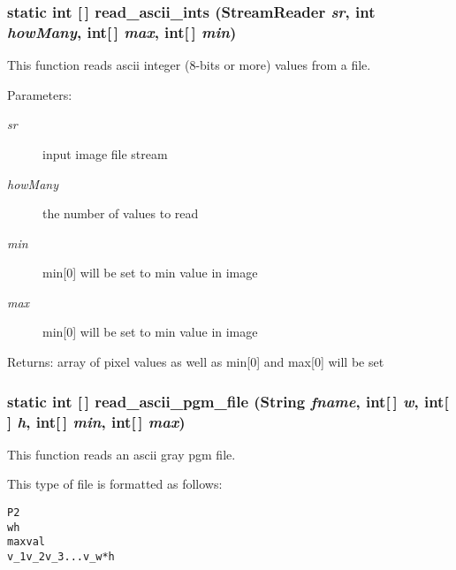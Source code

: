 \subsubsection{\setlength{\rightskip}{0pt plus 5cm}static int [$\,$] read\_\-ascii\_\-ints (Stream\-Reader {\em sr}, int {\em how\-Many}, int[$\,$] {\em max}, int[$\,$] {\em min})\hspace{0.3cm}{\tt  [static, protected]}}\label{class_c_s_image_viewer_1_1pnm_helper_6fe0359657ec33392595cf78659fbc9f}


This function reads ascii integer (8-bits or more) values from a file. 

\begin{Desc}
\item[Parameters:]
\begin{description}
\item[{\em sr}]input image file stream \item[{\em how\-Many}]the number of values to read \item[{\em min}]min[0] will be set to min value in image \item[{\em max}]min[0] will be set to min value in image\end{description}
\end{Desc}
\begin{Desc}
\item[Returns:]array of pixel values as well as min[0] and max[0] will be set \end{Desc}
\subsubsection{\setlength{\rightskip}{0pt plus 5cm}static int [$\,$] read\_\-ascii\_\-pgm\_\-file (String {\em fname}, int[$\,$] {\em w}, int[$\,$] {\em h}, int[$\,$] {\em min}, int[$\,$] {\em max})\hspace{0.3cm}{\tt  [static, protected]}}\label{class_c_s_image_viewer_1_1pnm_helper_3bd4246b9d877004064ab5792ed6d16d}


This function reads an ascii gray pgm file. 

This type of file is formatted as follows: \small\begin{alltt}
    P2
    w h
    maxval
    v\_1 v\_2 v\_3 . . . v\_w*h
  \end{alltt}\normalsize 


